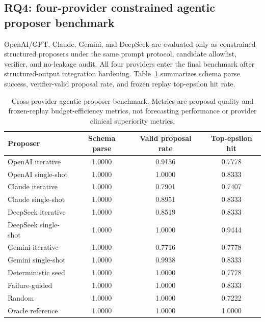 \subsection{RQ4: four-provider constrained agentic proposer benchmark}

OpenAI/GPT, Claude, Gemini, and DeepSeek are evaluated only as constrained
structured proposers under the same prompt protocol, candidate allowlist,
verifier, and no-leakage audit. All four providers enter the final benchmark
after structured-output integration hardening. Table~\ref{tab:providers}
summarizes schema parse success, verifier-valid proposal rate, and frozen
replay top-epsilon hit rate.

\begin{table}[t]
\centering
\small
\caption{Cross-provider agentic proposer benchmark. Metrics are proposal
quality and frozen-replay budget-efficiency metrics, not forecasting
performance or provider clinical superiority metrics.}
\label{tab:providers}
\begin{tabular}{lccc}
\toprule
Proposer & Schema parse & Valid proposal rate & Top-epsilon hit \\
\midrule
OpenAI iterative & \num{1.0000} & \num{0.9136} & \num{0.7778} \\
OpenAI single-shot & \num{1.0000} & \num{1.0000} & \num{0.8333} \\
Claude iterative & \num{1.0000} & \num{0.7901} & \num{0.7407} \\
Claude single-shot & \num{1.0000} & \num{0.8951} & \num{0.8333} \\
DeepSeek iterative & \num{1.0000} & \num{0.8519} & \num{0.8333} \\
DeepSeek single-shot & \num{1.0000} & \num{1.0000} & \num{0.9444} \\
Gemini iterative & \num{1.0000} & \num{0.7716} & \num{0.7778} \\
Gemini single-shot & \num{1.0000} & \num{0.9938} & \num{0.8333} \\
\midrule
Deterministic seed & \num{1.0000} & \num{1.0000} & \num{0.7778} \\
Failure-guided & \num{1.0000} & \num{1.0000} & \num{0.8333} \\
Random & \num{1.0000} & \num{1.0000} & \num{0.7222} \\
Oracle reference & \num{1.0000} & \num{1.0000} & \num{1.0000} \\
\bottomrule
\end{tabular}
\end{table}

